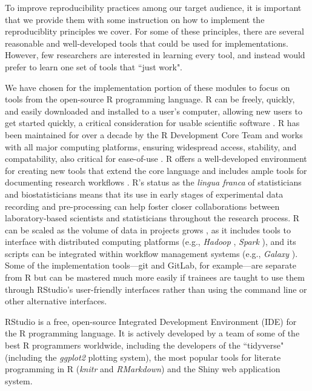 \documentclass[pdftex,english,11pt,parskip=half]{scrartcl}
\begin{document}
To improve reproducibility practices among our target audience, it is important
that we provide them with some instruction on how to implement the
reproduciblity principles we cover. For some of these principles, there are
several reasonable and well-developed tools that could be used for
implementations. However, few researchers are interested in learning every tool,
and instead would prefer to learn one set of tools that ``just work". 

We have chosen for the implementation portion of these
modules to focus on tools from the open-source R programming language. R can be
freely, quickly, and easily downloaded and installed to a user's computer,
allowing new users to get started quickly, a critical consideration for usable
scientific software \cite{list2017ten}. R has been maintained for over a decade
by the R Development Core Team and works with all major computing platforms,
ensuring  widespread access, stability, and compatability, also critical for
ease-of-use \cite{baumer2017lessons, altschul2013anatomy}. R offers a
well-developed environment for creating new tools that extend the core language
\cite{wickham2015r} and includes ample tools for documenting research workflows
\cite{xie2015dynamic, xie2016bookdown}. R's status as the \textit{lingua franca}
of statisticians and biostatisticians means that its use in early stages of
experimental data recording and pre-processing can help foster closer
collaborations between laboratory-based scientists and statisticians throughout
the research process. R can be scaled as the volume of data in projects grows
\cite{list2017ten}, as it includes tools to interface with distributed computing
platforms (e.g., \textit{Hadoop} \cite{pathak2014rhadoop}, \textit{Spark}
\cite{sparklyr}), and its scripts can be integrated within workflow management
systems (e.g., \textit{Galaxy} \cite{goecks2010galaxy, walker2016models}). Some
of the implementation tools---git and GitLab, for example---are separate from R
but can be mastered much more easily if trainees are taught to use them through
RStudio's user-friendly interfaces rather than using the command line or other
alternative interfaces.

RStudio is a free, open-source Integrated Development Environment (IDE) for the R programming language. It is actively developed by a team of some of the best R programmers worldwide, including the developers of the ``tidyverse" (including the \textit{ggplot2} plotting system), the most popular tools for literate programming in R (\textit{knitr} and \textit{RMarkdown}) and the Shiny web application system. 
\end{document}
